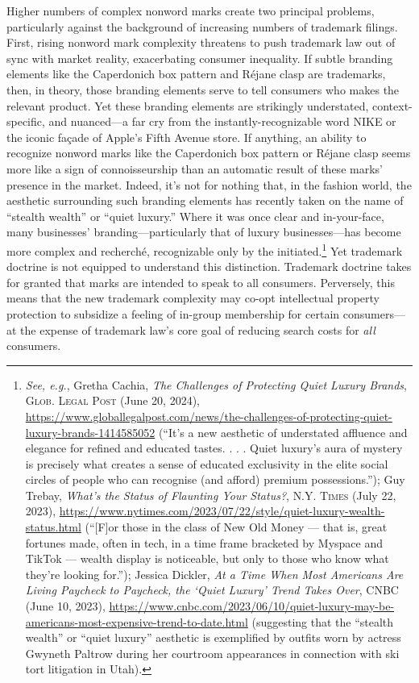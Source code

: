 \documentclass[letterpaper, 11pt, oneside]{article}
\begin{document}
Higher numbers of complex nonword marks create two principal problems, particularly against the background of increasing numbers of trademark filings. First, rising nonword mark complexity threatens to push trademark law out of sync with market reality, exacerbating consumer inequality. If subtle branding elements like the Caperdonich box pattern and Réjane clasp are trademarks, then, in theory, those branding elements serve to tell consumers who makes the relevant product. Yet these branding elements are strikingly understated, context-specific, and nuanced—a far cry from the instantly-recognizable word NIKE or the iconic façade of Apple's Fifth Avenue store. If anything, an ability to recognize nonword marks like the Caperdonich box pattern or Réjane clasp seems more like a sign of connoisseurship than an automatic result of these marks' presence in the market. Indeed, it's not for nothing that, in the fashion world, the aesthetic surrounding such branding elements has recently taken on the name of ``stealth wealth'' or ``quiet luxury.'' Where it was once clear and in-your-face, many businesses' branding—particularly that of luxury businesses—has become more complex and recherché, recognizable only by the initiated.\footnote{\textit{See, e.g.}, Gretha Cachia, \textit{The Challenges of Protecting Quiet Luxury Brands}, \textsc{Glob. Legal Post} (June 20, 2024), \url{https://www.globallegalpost.com/news/the-challenges-of-protecting-quiet-luxury-brands-1414585052} (``It’s a new aesthetic of understated affluence and elegance for refined and educated tastes. . . . Quiet luxury’s aura of mystery is precisely what creates a sense of educated exclusivity in the elite social circles of people who can recognise (and afford) premium possessions.''); Guy Trebay, \textit{What's the Status of Flaunting Your Status?}, \textsc{N.Y. Times} (July 22, 2023), \url{https://www.nytimes.com/2023/07/22/style/quiet-luxury-wealth-status.html} (``[F]or those in the class of New Old Money — that is, great fortunes made, often in tech, in a time frame bracketed by Myspace and TikTok — wealth display is noticeable, but only to those who know what they’re looking for.''); Jessica Dickler, \textit{At a Time When Most Americans Are Living Paycheck to Paycheck, the ‘Quiet Luxury’ Trend Takes Over}, CNBC (June 10, 2023), \url{https://www.cnbc.com/2023/06/10/quiet-luxury-may-be-americans-most-expensive-trend-to-date.html} (suggesting that the ``stealth wealth'' or ``quiet luxury'' aesthetic is exemplified by outfits worn by actress Gwyneth Paltrow during her courtroom appearances in connection with ski tort litigation in Utah).} Yet trademark doctrine is not equipped to understand this distinction. Trademark doctrine takes for granted that marks are intended to speak to all consumers. Perversely, this means that the new trademark complexity may co-opt intellectual property protection to subsidize a feeling of in-group membership for certain consumers—at the expense of trademark law's core goal of reducing search costs for \textit{all} consumers.
\end{document}
